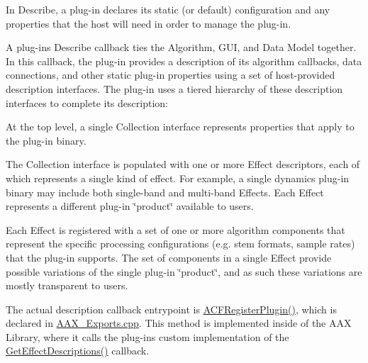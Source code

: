  In Describe, a plug-\/in declares its static (or default) configuration and any properties that the host will need in order to manage the plug-\/in.

 A plug-\/in\textquotesingle{}s Describe callback ties the Algorithm, G\+U\+I, and Data Model together. In this callback, the plug-\/in provides a description of its algorithm callbacks, data connections, and other static plug-\/in properties using a set of host-\/provided description interfaces. The plug-\/in uses a tiered hierarchy of these description interfaces to complete its description\+: 
\begin{DoxyItemize}
\item At the top level, a single Collection interface represents properties that apply to the plug-\/in binary.  
\item The Collection interface is populated with one or more Effect descriptors, each of which represents a single kind of effect. For example, a single dynamics plug-\/in binary may include both single-\/band and multi-\/band Effects. Each Effect represents a different plug-\/in \char`\"{}product\char`\"{} available to users.  
\item Each Effect is registered with a set of one or more algorithm components that represent the specific processing configurations (e.\+g. stem formats, sample rates) that the plug-\/in supports. The set of components in a single Effect provide possible variations of the single plug-\/in \char`\"{}product\char`\"{}, and as such these variations are mostly transparent to users.  
\end{DoxyItemize}

 The actual description callback entrypoint is \hyperlink{a00209_aa455fa4d9a2236334d0fd959b4919788}{A\+C\+F\+Register\+Plugin()}, which is declared in \hyperlink{a00209}{A\+A\+X\+\_\+\+Exports.\+cpp}. This method is implemented inside of the A\+A\+X Library, where it calls the plug-\/in\textquotesingle{}s custom implementation of the \hyperlink{a00326_gae0d356eef326f77cbb972e48946d4892}{Get\+Effect\+Descriptions()} callback.


